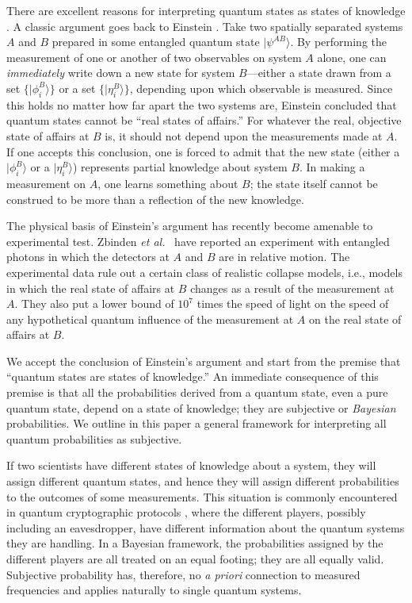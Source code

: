 \documentclass[aps,12pt]{revtex4}
\begin{document}
There are excellent reasons for interpreting quantum states as states
of knowledge \cite{FuchsPeres00}. A classic argument goes back to
Einstein \cite{Einstein}. Take two spatially separated systems $A$
and $B$ prepared in some entangled quantum state
$|\psi^{\scriptscriptstyle AB}\rangle$.  By performing the
measurement of one or another of two observables on system $A$
alone, one can {\it immediately\/} write down a new state for system
$B$---either a state drawn from a set $\{|\phi_i^{\scriptscriptstyle
B}\rangle\}$ or a set $\{|\eta_i^{\scriptscriptstyle B}\rangle\}$,
depending upon which observable is measured.  Since this holds no
matter how far apart the two systems are, Einstein concluded that
quantum states cannot be ``real states of affairs.''  For whatever
the real, objective state of affairs at $B$ is, it should not depend
upon the measurements made at $A$.  If one accepts this conclusion,
one is forced to admit that the new state (either a
$|\phi_i^{\scriptscriptstyle B}\rangle$ or a
$|\eta_i^{\scriptscriptstyle B}\rangle$) represents partial knowledge
about system $B$.  In making a measurement on $A$, one learns
something about $B$; the state itself cannot be construed to be more
than a reflection of the new knowledge.

The physical basis of
Einstein's argument has recently become amenable to experimental
test. Zbinden {\it et al.}~\cite{Zbinden2001} have reported an
experiment with entangled photons in which the detectors at $A$ and
$B$ are in relative motion. The experimental data rule out a certain
class of realistic collapse models, i.e., models in which the real
state of affairs at $B$ changes as a result of the measurement at
$A$. They also put a lower bound of $10^7$ times the speed of light
on the speed of any hypothetical quantum influence of the measurement
at $A$ on the real state of affairs at $B$.

We accept the conclusion of Einstein's argument and start from the
premise that ``quantum states are states of knowledge.''  An
immediate consequence of this premise is that all the probabilities
derived from a quantum state, even a pure quantum state, depend on a
state of knowledge; they are subjective or {\it Bayesian\/}
probabilities.  We outline in this paper a general framework for
interpreting all quantum probabilities as subjective.

If two scientists have different states of knowledge about a system,
they will assign different quantum states, and hence they will
assign different probabilities to the outcomes of some measurements.
This situation is commonly encountered in quantum cryptographic
protocols \cite{Gisin01}, where the different players, possibly
including an eavesdropper, have different information about the
quantum systems they are handling. In a Bayesian framework, the
probabilities assigned by the different players are all treated on an
equal footing; they are all equally valid. Subjective probability has,
therefore, no {\it a priori\/} connection to measured frequencies and
applies naturally to single quantum systems.
\end{document}
